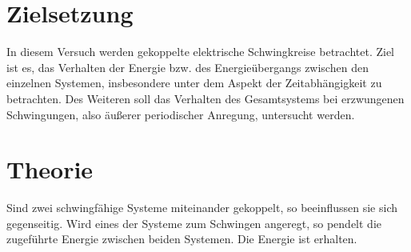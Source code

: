 \section{Zielsetzung}
In diesem Versuch werden gekoppelte elektrische Schwingkreise betrachtet. 
Ziel ist es, das Verhalten der Energie bzw. des Energieübergangs zwischen den einzelnen Systemen, insbesondere unter dem Aspekt der Zeitabhängigkeit zu betrachten. 
Des Weiteren soll das Verhalten des Gesamtsystems bei erzwungenen Schwingungen, also äußerer periodischer Anregung, untersucht werden.
\section{Theorie}
\label{sec:Theorie}
Sind zwei schwingfähige Systeme miteinander gekoppelt, so beeinflussen sie sich gegenseitig.
Wird eines der Systeme zum Schwingen angeregt, so pendelt die zugeführte Energie zwischen beiden Systemen. Die Energie ist erhalten.
